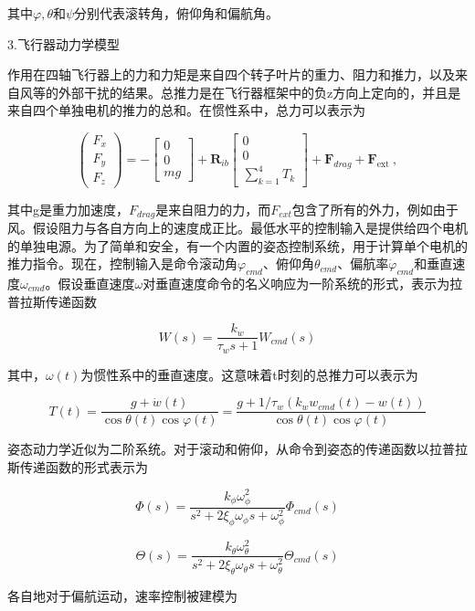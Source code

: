 其中$\varphi, \theta$和$\psi$分别代表滚转角，俯仰角和偏航角。

3.飞行器动力学模型

作用在四轴飞行器上的力和力矩是来自四个转子叶片的重力、阻力和推力，以及来自风等的外部干扰的结果。总推力是在飞行器框架中的负z方向上定向的，并且是来自四个单独电机的推力的总和。在惯性系中，总力可以表示为

$$
\left(\begin{array}{l}
F_{x} \\
F_{y} \\
F_{z}
\end{array}\right)=-\left[\begin{array}{c}
0 \\
0 \\
m g
\end{array}\right]+\boldsymbol{R}_{i b}\left[\begin{array}{c}
0 \\
0 \\
\sum_{k=1}^{4} T_{k}
\end{array}\right]+\boldsymbol{F}_{d r a g}+\boldsymbol{F}_{\text {ext }},
$$

其中g是重力加速度，$F_{drag}$是来自阻力的力，而$F_{ext}$包含了所有的外力，例如由于风。假设阻力与各自方向上的速度成正比。最低水平的控制输入是提供给四个电机的单独电源。为了简单和安全，有一个内置的姿态控制系统，用于计算单个电机的推力指令。现在，控制输入是命令滚动角$\varphi_{cmd}$、俯仰角$\theta_{cmd}$、偏航率$\dot{\varphi}_{cmd}$和垂直速度$\omega_{cmd}$。假设垂直速度$\omega$对垂直速度命令的名义响应为一阶系统的形式，表示为拉普拉斯传递函数

$$
W(s)=\frac{k_{w}}{\tau_{w} s+1} W_{c m d}(s)
$$

其中，$\omega(t)$为惯性系中的垂直速度。这意味着t时刻的总推力可以表示为

$$
T(t)=\frac{g+\dot{w}(t)}{\cos \theta(t) \cos \varphi(t)}=\frac{g+1 / \tau_{w}\left(k_{w} w_{c m d}(t)-w(t)\right)}{\cos \theta(t) \cos \varphi(t)}
$$

姿态动力学近似为二阶系统。对于滚动和俯仰，从命令到姿态的传递函数以拉普拉斯传递函数的形式表示为

$$
\Phi(s)=\frac{k_{\phi} \omega_{\phi}^{2}}{s^{2}+2 \xi_{\phi} \omega_{\phi} s+\omega_{\phi}^{2}} \Phi_{c m d}(s)
$$

$$
\Theta(s)=\frac{k_{\theta} \omega_{\theta}^{2}}{s^{2}+2 \xi_{\theta} \omega_{\theta} s+\omega_{\theta}^{2}} \Theta_{c m d}(s)
$$

各自地对于偏航运动，速率控制被建模为


